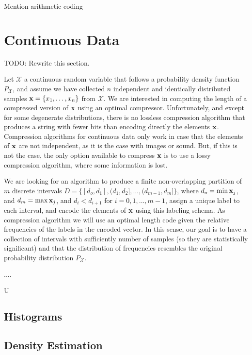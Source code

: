 {\color{red} Mention arithmetic coding}

%
%

\section{Continuous Data}
\label{sec:codes_continuous_data}

{\color{red} TODO: Rewrite this section.}

Let $\mathcal{X}$ a continuous random variable that follows a probability density function $P_\mathcal{X}$, and assume we have collected $n$ independent and identically distributed samples $\bold{x} = \{x_1, \ldots, x_n\}$ from $\mathcal{X}$. We are interested in computing the length of a compressed version of $\bold{x}$ using an optimal compressor. Unfortunately, and except for some degenerate distributions, there is no lossless compression algorithm that produces a string with fewer bits than encoding directly the elements $\bold{x}$. Compression algorithms for continuous data only work in case that the elements of $\bold{x}$ are not independent, as it is the case with images or sound. But, if this is not the case, the only option available to compress $\bold{x}$ is to use a lossy compression algorithm, where some information is lost.

We are looking for an algorithm to produce a finite non-overlapping partition of $m$ discrete intervals $D=\{ [d_o, d_1], (d_1, d_2], \ldots, (d_{m-1}, d_m] \}$, where $d_o = \min{\bold{x}_j}$, and $d_m = \max{\bold{x}_j}$, and $d_i < d_{i+1}$ for $i = 0, 1, \ldots, m-1$, assign a unique label to each interval, and encode the elements of $\bold{x}$ using this labeling schema. As compression algorithm we will use an optimal length code given the relative frequencies of the labels in the encoded vector. In this sense, our goal is to have a collection of intervals with sufficiently number of samples (so they are statistically significant) and that the distribution of frequencies resembles the original probability distribution $P_\mathcal{X}$.
 

....

U




\subsection{Histograms}

\subsection{Density Estimation}

